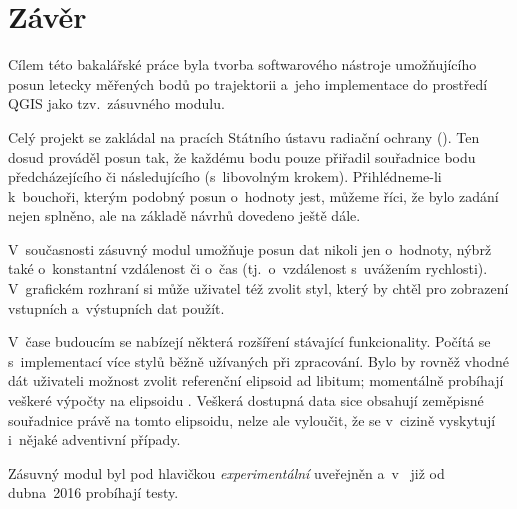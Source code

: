 \chapter{Závěr}
\label{zaver}

Cílem této bakalářské práce byla tvorba
softwarového nástroje umožňujícího posun letecky
měřených bodů po trajektorii a~jeho implementace
do prostředí QGIS jako tzv.~zásuvného modulu. 

Celý projekt se zakládal na pracích Státního
ústavu radiační ochrany (). Ten dosud prováděl posun
tak, že každému bodu pouze přiřadil souřadnice bodu
předcházejícího či následujícího (s~libovolným
krokem). Přihlédneme-li k~bouchoři, kterým podobný posun
o~hodnoty jest, můžeme říci, že bylo zadání
nejen splněno, ale na základě návrhů 
dovedeno ještě dále. 

V~současnosti zásuvný modul umožňuje posun dat
nikoli jen o~hodnoty, nýbrž také o~konstantní
vzdálenost či o~čas (tj.~o~vzdálenost
s~uvážením rychlosti). V~grafic\-kém
rozhraní si může uživatel též zvolit styl,
který by chtěl pro zobrazení vstupních
a~výstupních dat použít. 

V~čase budoucím se nabízejí některá rozšíření
stávající funkcionality. Počítá se s~implementací
více stylů běžně užívaných při zpracování. Bylo by
rovněž vhodné dát uživateli možnost zvolit
referenční elipsoid ad libitum; momentálně
probíhají veš\-keré výpočty na elipsoidu .
Veškerá dostupná data sice obsahují zeměpisné souřadnice
právě na tomto elipsoidu, nelze ale vyloučit, že
se v~cizině vyskytují i~nějaké adventivní případy.

Zásuvný modul byl pod hlavičkou \textit{experimentální}
uveřejněn a~v~ již od dubna~2016 probíhají testy.


